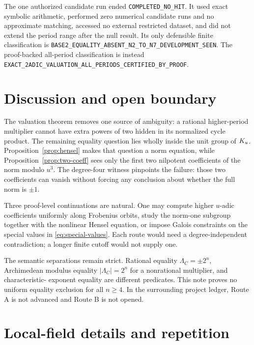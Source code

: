 \documentclass[11pt]{article}
\theoremstyle{definition}
\theoremstyle{remark}
\begin{document}
The one authorized candidate run ended
\texttt{COMPLETED\_NO\_HIT}.  It used exact symbolic arithmetic, performed
zero numerical candidate runs and no approximate matching, accessed no
external restricted dataset, and did not extend the period range after the
null result.  Its only defensible finite classification is
\texttt{BASE2\_EQUALITY\_ABSENT\_N2\_TO\_N7\_DEVELOPMENT\_SEEN}.
The proof-backed all-period classification is instead
\texttt{EXACT\_2ADIC\_VALUATION\_ALL\_PERIODS\_CERTIFIED\_BY\_PROOF}.

\section{Discussion and open boundary}
\label{sec:discussion}

The valuation theorem removes one source of ambiguity: a rational
higher-period multiplier cannot have extra powers of two hidden in its
normalized cycle product.  The remaining equality question lies wholly
inside the unit group of \(K_u\).  Proposition~\ref{prop:hensel} makes that
question a norm equation, while Proposition~\ref{prop:two-coeff} sees only
the first two nilpotent coefficients of the norm modulo \(u^3\).  The
degree-four witness pinpoints the failure: those two coefficients can vanish
without forcing any conclusion about whether the full norm is \(\pm1\).

Three proof-level continuations are natural.  One may compute higher
\(u\)-adic coefficients uniformly along Frobenius orbits, study the norm-one
subgroup together with the nonlinear Hensel equation, or impose Galois
constraints on the special values in \eqref{eq:special-values}.  Each route
would need a degree-independent contradiction; a longer finite cutoff would
not supply one.

The semantic separations remain strict.  Rational equality
\(\Lambda_C=\pm2^n\), Archimedean modulus equality
\(|\Lambda_C|=2^n\) for a nonrational multiplier, and characteristic-
exponent equality are different predicates.  This note proves no uniform
equality exclusion for all \(n\ge4\).  In the surrounding project ledger,
Route A is not
advanced and Route B is not opened.




\clearpage
\appendix

\section{Local-field details and repetition}
\label{app:local}
\end{document}
